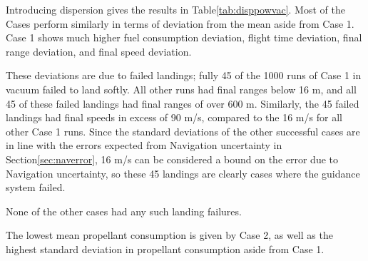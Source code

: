 Introducing dispersion gives the results in Table\:\ref{tab:disppowvac}. Most of the Cases perform similarly in terms of deviation from the mean aside from Case 1. Case 1 shows much higher fuel consumption deviation, flight time deviation, final range deviation, and final speed deviation. 

These deviations are due to failed landings; fully 45 of the 1000 runs of Case 1 in vacuum failed to land softly. All other runs had final ranges below 16 m, and all 45 of these failed landings had final ranges of over 600 m. Similarly, the 45 failed landings had final speeds in excess of 90 m/s, compared to the 16 m/s for all other Case 1 runs. Since the standard deviations of the other successful cases are in line with the errors expected from Navigation uncertainty in Section\:\ref{sec:naverror}, 16 m/s can be considered a bound on the error due to Navigation uncertainty, so these 45 landings are clearly cases where the guidance system failed.

None of the other cases had any such landing failures.

The lowest mean propellant consumption is given by Case 2, as well as the highest standard deviation in propellant consumption aside from Case 1.

